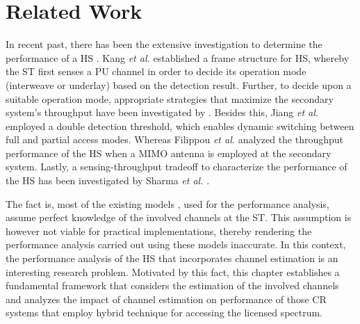 \section{Related Work}


In recent past, there has been the extensive investigation to determine the performance of a HS \cite{Kang09, Oh10, Senthu12, Song13, Gmira15, Jiang13, Fili15, Sharma14}. Kang \textit{et al.} \cite{Kang09} established a frame structure for HS, whereby the ST first senses a PU channel in order to decide its operation mode (interweave or underlay) based on the detection result. Further, to decide upon a suitable operation mode, appropriate strategies that maximize the secondary system's throughput have been investigated by \cite{Oh10, Senthu12, Song13, Gmira15}. Besides this, Jiang \textit{et al.} \cite{Jiang13} employed a double detection threshold, which enables dynamic switching between full and partial access modes. Whereas Filippou \textit{et al.} \cite{Fili15} analyzed the throughput performance of the HS when a MIMO antenna is employed at the secondary system. Lastly, a sensing-throughput tradeoff to characterize the performance of the HS has been investigated by Sharma \textit{et al.} \cite{Sharma14}. 

The fact is, most of the existing models \cite{Kang09, Oh10, Senthu12, Song13, Gmira15, Jiang13, Fili15, Sharma14}, used for the performance analysis, assume perfect knowledge of the involved channels at the ST. This assumption is however not viable for practical implementations, thereby rendering the performance analysis carried out using these models inaccurate. In this context, the performance analysis of the HS that incorporates channel estimation is an interesting research problem. Motivated by this fact, this chapter establishes a fundamental framework that considers the estimation of the involved channels and analyzes the impact of channel estimation on performance of those CR systems that employ hybrid technique for accessing the licensed spectrum.
